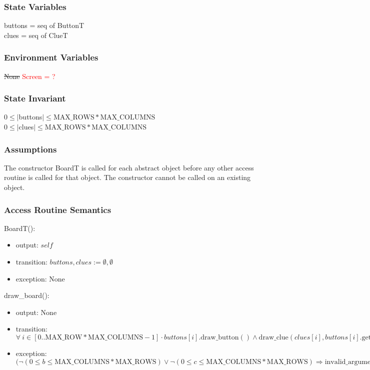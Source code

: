 \documentclass[12pt]{article}
\begin{document}
\subsubsection* {State Variables}
buttons = seq of ButtonT\\
clues = seq of ClueT

\subsubsection* {Environment Variables}
\sout{None}
\textcolor{red}{Screen = ?}

\subsubsection* {State Invariant}
$0\leq |$buttons$| \leq \text{MAX\_ROWS} * \text{MAX\_COLUMNS}$\\
$0\leq |$clues$| \leq \text{MAX\_ROWS} * \text{MAX\_COLUMNS}$\\

\subsubsection* {Assumptions}
The constructor BoardT is called for each abstract object before any other access routine is called for that object.  The constructor cannot be called on an existing object.

\subsubsection* {Access Routine Semantics}

BoardT():
\begin{itemize}
\item output: $\mathit{self}$
\item transition: $\mathit{buttons},\mathit{clues} := \emptyset, \emptyset$
\item exception: None
\end{itemize}

\noindent draw\_board():
\begin{itemize}
\item output: None
\item transition: $\forall\  i \in [0..\text{MAX\_ROW}*\text{MAX\_COLUMNS} - 1] \cdot buttons[i].\text{draw\_button}() \land \text{draw\_clue} (clues[i], buttons[i].\text{get\_row}())$
\item exception: $(\lnot(0\leq b\leq \text{MAX\_COLUMNS}*\text{MAX\_ROWS}) \lor \lnot(0\leq c\leq \text{MAX\_COLUMNS}*\text{MAX\_ROWS}) \Rightarrow \text{invalid\_argument}$
\end{itemize}
\end{document}
